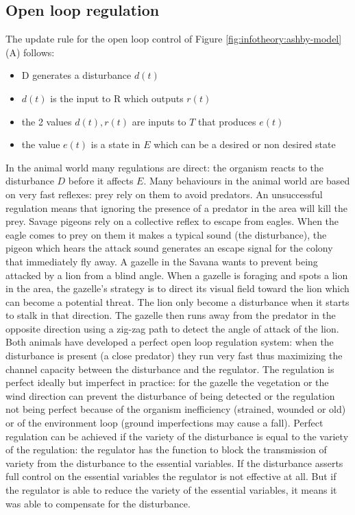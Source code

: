 \subsection{Open loop regulation}
The update rule for the open loop control of Figure \ref{fig:infotheory:ashby-model}(A) follows:
\begin{itemize}
 \item D generates a disturbance $d(t)$
 \item $d(t)$ is the input to R which outputs $r(t)$
 \item the 2 values $d(t),r(t)$ are inputs to $T$ that produces $e(t)$
 \item the value $e(t)$ is a state in $E$ which can be a desired or non desired state
\end{itemize}
In the animal world many regulations are direct: the organism reacts to the disturbance $D$ before it affects $E$.
Many behaviours in the animal world are based on very fast reflexes: prey rely on them to avoid predators.
An unsuccessful regulation means that ignoring the presence of a predator in the area will kill the prey.
Savage pigeons rely on a collective reflex to escape from eagles.
When the eagle comes to prey on them it makes a typical sound (the disturbance),
the pigeon which hears the attack sound generates an escape signal for the colony
 that immediately fly away.
A gazelle in the Savana wants to prevent being attacked by a lion from a blind angle.
When a gazelle is foraging and spots a lion in the area, the gazelle's strategy is
 to direct its visual field toward the lion which can become a potential threat.
The lion only become a disturbance when it starts to stalk in that direction.
The gazelle then runs away from the predator in the opposite direction using a 
zig-zag path to detect the angle of attack of the lion. Both animals have
developed a perfect open loop regulation system: when the disturbance is present
(a close predator) they run very fast thus maximizing the channel capacity between
 the disturbance and the regulator. The regulation is perfect ideally but imperfect
 in practice: for the gazelle the vegetation or the wind direction can prevent
the disturbance of being detected or the regulation not being perfect because
 of the organism inefficiency (strained, wounded or old) or of the environment
 loop (ground imperfections may cause a fall).
Perfect regulation can be achieved if the variety of the disturbance is equal
to the variety of the regulation: the regulator has the function to block the
transmission of variety from the disturbance to the essential variables.
If the disturbance asserts full control on the essential variables the regulator
 is not effective at all. But if the regulator is able to reduce the variety of
the essential variables, it means it was able to compensate for the disturbance.


